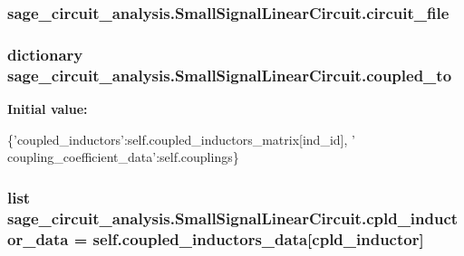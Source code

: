 \hypertarget{classsage__circuit__analysis_1_1SmallSignalLinearCircuit_ae7aff4af6a42a3d63d6c4dce56118bfd}{
\subsubsection[{circuit\-\_\-file}]{\setlength{\rightskip}{0pt plus 5cm}sage\-\_\-circuit\-\_\-analysis.\-Small\-Signal\-Linear\-Circuit.\-circuit\-\_\-file}}\label{classsage__circuit__analysis_1_1SmallSignalLinearCircuit_ae7aff4af6a42a3d63d6c4dce56118bfd}
\hypertarget{classsage__circuit__analysis_1_1SmallSignalLinearCircuit_a9797e65af0cef424fd7e514ded67854c}{
\subsubsection[{coupled\-\_\-to}]{\setlength{\rightskip}{0pt plus 5cm}dictionary sage\-\_\-circuit\-\_\-analysis.\-Small\-Signal\-Linear\-Circuit.\-coupled\-\_\-to\hspace{0.3cm}{\ttfamily [static]}}}\label{classsage__circuit__analysis_1_1SmallSignalLinearCircuit_a9797e65af0cef424fd7e514ded67854c}
{\bfseries Initial value\-:}
\begin{DoxyCode}
\{\textcolor{stringliteral}{'coupled\_inductors'}:self.coupled\_inductors\_matrix[ind\_id],
                                                        \textcolor{stringliteral}{'
      coupling\_coefficient\_data'}:self.couplings\}
\end{DoxyCode}
\hypertarget{classsage__circuit__analysis_1_1SmallSignalLinearCircuit_ae12c94c0a4cee8ca416fc9895b68d57f}{
\subsubsection[{cpld\-\_\-inductor\-\_\-data}]{\setlength{\rightskip}{0pt plus 5cm}list sage\-\_\-circuit\-\_\-analysis.\-Small\-Signal\-Linear\-Circuit.\-cpld\-\_\-inductor\-\_\-data = self.\-coupled\-\_\-inductors\-\_\-data\mbox{[}cpld\-\_\-inductor\mbox{]}\hspace{0.3cm}{\ttfamily [static]}}}\label{classsage__circuit__analysis_1_1SmallSignalLinearCircuit_ae12c94c0a4cee8ca416fc9895b68d57f}
